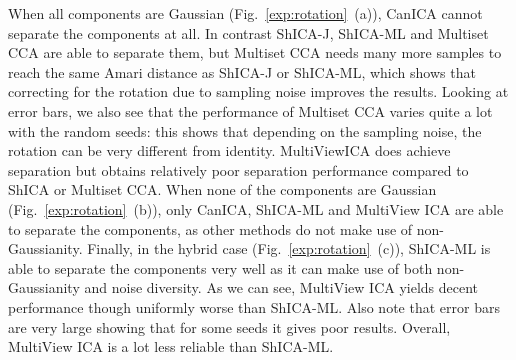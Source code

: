 When all components are Gaussian (Fig.~\ref{exp:rotation}~(a)), CanICA cannot
separate the components at all. In contrast ShICA-J, ShICA-ML and Multiset CCA
are able to separate them, but Multiset CCA needs many more samples to reach the
same Amari distance as ShICA-J or ShICA-ML, which shows that correcting for the
rotation due to sampling noise improves the results. Looking at error bars, we
also see that the performance of Multiset CCA varies quite a lot with the random
seeds: this shows that depending on the sampling noise, the rotation can be very
different from identity. MultiViewICA does achieve separation but obtains
relatively poor separation performance compared to ShICA or Multiset CCA.
When none of the components are Gaussian (Fig.~\ref{exp:rotation}~(b)), only
CanICA, ShICA-ML and MultiView ICA are able to separate the components, as other methods do not make use of non-Gaussianity.
Finally, in the hybrid case (Fig.~\ref{exp:rotation}~(c)), ShICA-ML is able to
separate the components very well as it can make use of both non-Gaussianity and
noise diversity. As we can see, MultiView ICA yields decent performance though
uniformly worse than ShICA-ML. Also note that error bars are very large showing
that for some seeds it gives poor results. Overall, MultiView ICA is a lot less
reliable than ShICA-ML.


